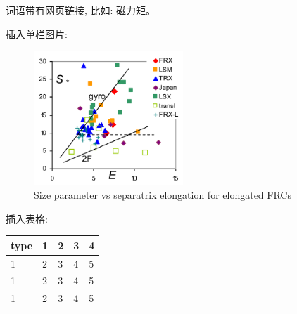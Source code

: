 \documentclass{article}
\begin{document}
词语带有网页链接, 比如: \href{https://zh.wikipedia.org/wiki/%E7%A3%81%E7%9F%A9}{磁力矩}。


插入单栏图片: 
\begin{figure}[!hbtp]
    \centering
    \includegraphics[width=0.5\textwidth]{figs/ctilt.png} 
    \caption{Size parameter vs separatrix elongation for elongated FRCs\cite{steinhauer2011review}}
    \label{fig: cgyro}
\end{figure}

插入表格: 
\begin{table}[!hbtp]
    \centering
    \begin{tabular}{lllll}
    \hline
    type & 1 & 2 & 3 & 4 \\ \hline
    1    & 2 & 3 & 4 & 5 \\ \hline
    1    & 2 & 3 & 4 & 5 \\ \hline
    1    & 2 & 3 & 4 & 5 \\ \hline
    \end{tabular}
\end{table}





\end{document}
